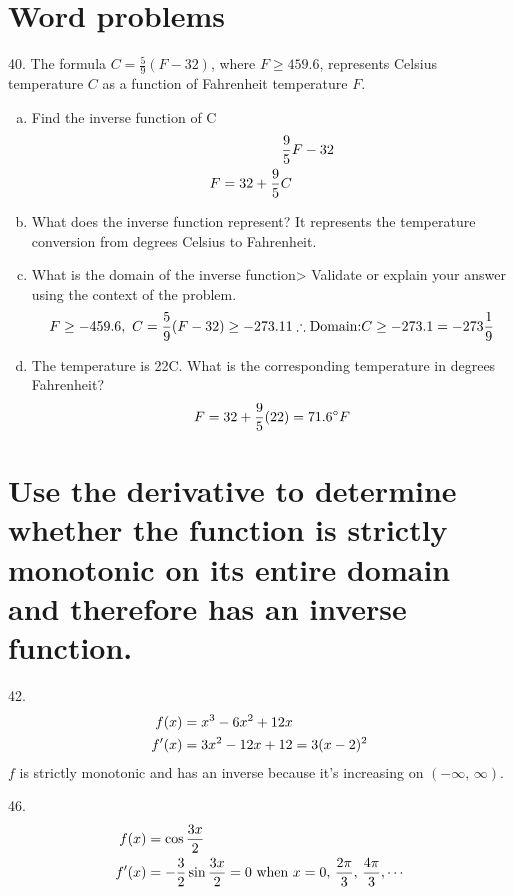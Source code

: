\documentclass[11pt]{article}
\newcommand*{\set}{\setcounter{equation}{0}}
\begin{document}
\section{Word problems}
40. The formula $C=\frac{5}{9}(F-32)$, where $F\geq 459.6$, represents Celsius temperature $C$ as a function of Fahrenheit temperature $F$.
\begin{enumerate}[(a)]
    \item Find the inverse function of C
        \begin{align}
            \set
            \frac{9}{5}&F-32\\
            F=32+\frac{9}{5}C
        \end{align}
    \item What does the inverse function represent?
        \indent It represents the temperature conversion from degrees Celsius to Fahrenheit.
    \item What is the domain of the inverse function> Validate or explain your answer using the context of the problem.
        \begin{align}
            \set
            F\geq -459.6,\,\, C=\frac{5}{9}(F-32)\geq -273.11
            \therefore\text{Domain:} C\geq -273.1=-273\frac{1}{9}
        \end{align}
    \item The temperature is 22\degree C. What is the corresponding temperature in degrees Fahrenheit?
        \begin{align}
            \set
            F=32+\frac{9}{5}(22)=71.6\degree F
        \end{align}
\end{enumerate}

\section{Use the derivative to determine whether the
function is strictly monotonic on its entire domain and therefore
has an inverse function.}
42.\begin{align}
    \set
    f(x)&=x^3-6x^2+12x\\
    f'(x)&=3x^2-12x+12=3(x-2)^2
\end{align}
$f$ is strictly monotonic and has an inverse because it's increasing on $(-\infty,\,\infty)$.

46.\begin{align}
    \set
    f(x)&=\cos\frac{3x}{2}\\
    f'(x)&=-\frac{3}{2}\sin\frac{3x}{2}=0\,\,\text{when}\,\, x=0,\,\frac{2\pi}{3},\,\frac{4\pi}{3},\cdots
\end{align}
\end{document}
